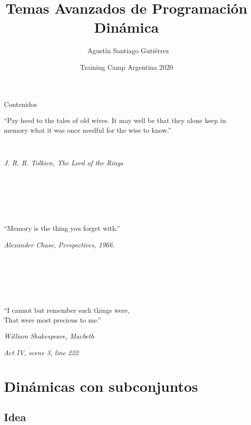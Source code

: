 \documentclass{beamer}
\title[DP Avanzada] %
{Temas Avanzados de Programación Dinámica}
\author[Agustín Gutiérrez] %
{~Agustín Santiago Gutiérrez}
\institute[UBA] %
{
  Facultad de Ciencias Exactas y Naturales\\
  Universidad de Buenos Aires
}
\date[TC 2019] %
{Training Camp Argentina 2020}
\begin{document}
\begin{frame}
  \titlepage
\end{frame}

\begin{frame}{Contenidos}
  \tableofcontents
\end{frame}

\begin{frame}
  ``Pay heed to the tales of old wives. It may well be that they alone keep in memory what it was once needful for the wise to know.''
  
  \ 
  
  \hfill \textit{J. R. R. Tolkien, The Lord of the Rings}

  \ 
  
  \ 
  
  \ 

``Memory is the thing you forget with.''


  \hfill \textit{Alexander Chase, Perspectives, 1966.}


  \ 
  
  \ 
  
  \ 

``I cannot but remember such things were, \\That were most precious to me.''

  \hfill \textit{William Shakespeare, Macbeth}
  
  \hfill \textit{Act IV, scene 3, line 222}
\end{frame}

\section{Dinámicas con subconjuntos}

\subsection{Idea}
\end{document}

